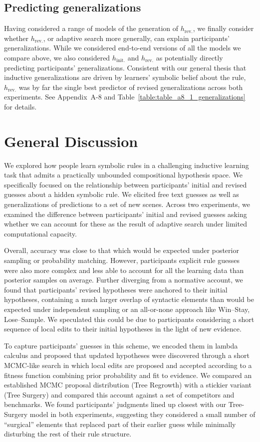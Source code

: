 \documentclass[doc,natbib,floatsintext]{apa7}
\newcommand{\hr}{h_{\mathrm{rev.}}}
\newcommand{\hi}{h_{\mathrm{init.}}}
\begin{document}
\subsection{Predicting generalizations}

Having considered a range of models of the generation of $\hr$, we finally consider whether $\hr$, or adaptive search more generally, can explain participants' generalizations. While we considered end-to-end versions of all the models we compare above, we also considered $\hi$ and $\hr$ as potentially directly predicting participants' generalizations. Consistent with our general thesis that inductive generalizations are driven by learners' symbolic belief about the rule, $\hr$ was by far the single best predictor of revised generalizations across both experiments. See Appendix~A-8 and Table~\ref{table:table_a8_1_generalizations} for details. 


\section{General Discussion}

We explored how people learn symbolic rules in a challenging inductive learning task that admits a practically unbounded compositional hypothesis space. We specifically focused on the relationship between participants’ initial and revised guesses about a hidden symbolic rule. We elicited free text guesses as well as generalizations of predictions to a set of new scenes. Across two experiments, we examined the difference between participants' initial and revised guesses asking whether we can account for these as the result of adaptive search under limited computational capacity. 

Overall, accuracy was close to that which would be expected under posterior sampling or probability matching. However, participants explicit rule guesses were also more complex and less able to account for all the learning data than posterior samples on average. Further diverging from a normative account, we found that participants' revised hypotheses were anchored to their initial hypotheses, containing a much larger overlap of syntactic elements than would be expected under independent sampling or an all-or-none approach like Win--Stay, Lose--Sample. We speculated this could be due to participants considering a short sequence of local edits to their initial hypotheses in the light of new evidence.

To capture participants' guesses in this scheme, we encoded them in lambda calculus and proposed that updated hypotheses were discovered through a short MCMC-like search in which local edits are proposed and accepted according to a fitness function combining prior probability and fit to evidence. We compared an established MCMC proposal distribution (Tree Regrowth) with a stickier variant (Tree Surgery) and compared this account against a set of competitors and benchmarks. We found participants' judgments lined up closest with our Tree-Surgery model in both experiments, suggesting they considered a small number of ``surgical'' elements that replaced part of their earlier guess while minimally disturbing the rest of their rule structure.
\end{document}
